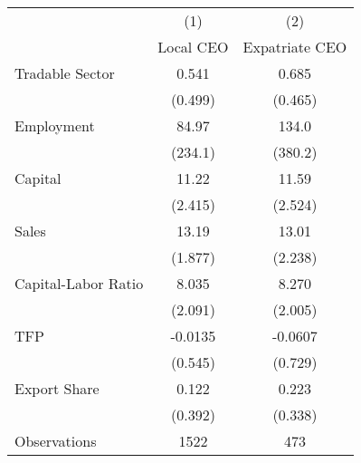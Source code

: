 {
\def\sym#1{\ifmmode^{#1}\else\(^{#1}\)\fi}
\begin{tabular}{l*{2}{c}}
\hline\hline
                    &\multicolumn{1}{c}{(1)}&\multicolumn{1}{c}{(2)}\\
                    &\multicolumn{1}{c}{Local CEO}&\multicolumn{1}{c}{Expatriate CEO}\\
\hline
Tradable Sector     &       0.541         &       0.685         \\
                    &     (0.499)         &     (0.465)         \\
[1em]
Employment          &       84.97         &       134.0         \\
                    &     (234.1)         &     (380.2)         \\
[1em]
Capital             &       11.22         &       11.59         \\
                    &     (2.415)         &     (2.524)         \\
[1em]
Sales               &       13.19         &       13.01         \\
                    &     (1.877)         &     (2.238)         \\
[1em]
Capital-Labor Ratio &       8.035         &       8.270         \\
                    &     (2.091)         &     (2.005)         \\
[1em]
TFP                 &     -0.0135         &     -0.0607         \\
                    &     (0.545)         &     (0.729)         \\
[1em]
Export Share        &       0.122         &       0.223         \\
                    &     (0.392)         &     (0.338)         \\
\hline
Observations        &        1522         &         473         \\
\hline\hline
\end{tabular}
}
